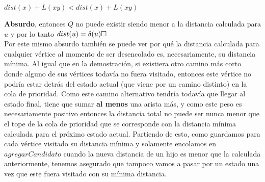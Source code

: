 \begin{center}
$dist(x)+L(xy) < dist(x) + L(xy)$
\\
\end{center}
\textbf{Absurdo}, entonces $Q$ no puede existir siendo menor a la distancia calculada para $u$ y por lo tanto $dist(u) = \delta(u) \QEDB$
\\

Por este mismo absurdo también se puede ver por qué la distancia calculada para cualquier vértice al momento de ser desencolado es, necesariamente, su distancia mínima. Al igual que en la demostración, si existiera otro camino más corto donde alguno de sus vértices todavía no fuera visitado, entonces este vértice no podría estar detrás del estado actual (que viene por un camino distinto) en la cola de prioridad. Como este camino alternativo tendría todavía que llegar al estado final, tiene que sumar \textbf{al menos} una arista más, y como este peso es necesariamente positivo entonces la distancia total no puede ser nunca menor que el tope de la cola de prioridad que se corresponde con la distancia mínima calculada para el próximo estado actual. Partiendo de esto, como guardamos para cada vértice visitado su distancia mínima y solamente encolamos en $agregarCandidato$ cuando la nueva distancia de un hijo es menor que la calculada anteriormente, tenemos asegurado que tampoco vamos a pasar por un estado una vez que este fuera visitado con su mínima distancia.
